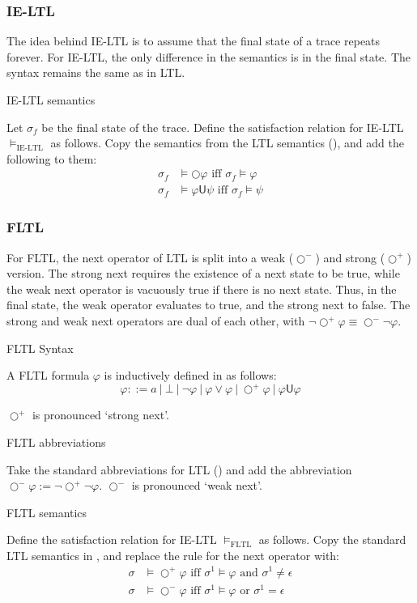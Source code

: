 \documentclass[a4paper]{article}
\newcommand{\U}{\mathsf{U}}
\newcommand{\tand}{\text{ and }}
\newcommand{\tor}{\text{ or }}
\newcommand{\tiff}{\text{ iff }}
\newcommand{\sn}{\bigcirc^+}
\newcommand{\wn}{\bigcirc^-}
\begin{document}
\subsubsection{IE-LTL} The idea behind IE-LTL is to assume that the final state of a trace repeats forever. For IE-LTL, the only difference in the semantics is in the final state. The syntax remains the same as in LTL.
\begin{defn}{IE-LTL semantics}

  Let $\sigma_f$ be the final state of the trace. Define the satisfaction relation for IE-LTL $\vDash_{\text{IE-LTL}}$ as follows. Copy the semantics from the LTL semantics (), and add the following to them:
  \begin{align*}
    \sigma_f &\vDash \bigcirc \varphi \tiff \sigma_f \vDash \varphi\\
    \sigma_f &\vDash \varphi \U \psi \tiff \sigma_f \vDash \psi
  \end{align*}
\end{defn}


\subsubsection{FLTL} For FLTL, the next operator of LTL is split into a weak ($\wn$) and strong ($\sn$) version.
The strong next requires the existence of a next state to be true, while the weak next operator is vacuously true if there is no next state.
Thus, in the final state, the weak operator evaluates to true, and the strong next to false. The strong and weak next operators are dual of each other, with  $\neg\sn\varphi \equiv \wn\neg\varphi$.

\begin{defn}{FLTL Syntax}

  A FLTL formula $\varphi$ is inductively defined in as follows:
  \[\varphi ::= a ~|~ \bot ~|~ \neg \varphi ~|~\varphi \lor \varphi ~|~ \sn \varphi ~|~ \varphi \U\varphi\]

  $\sn$ is pronounced `strong next'.
\end{defn}

\begin{notn}{FLTL abbreviations}\label{fltlabbrev}

  Take the standard abbreviations for LTL () and add the abbreviation $\wn \varphi:= \neg \sn \neg \varphi$. $\wn$ is pronounced `weak next'.
\end{notn}

\begin{defn}{FLTL semantics}

  Define the satisfaction relation for IE-LTL $\vDash_{\text{FLTL}}$ as follows.
  Copy the standard LTL semantics in , and replace the rule for the next operator with:
  \begin{align*}
    \sigma&\vDash\sn\varphi \tiff \sigma^1\vDash\varphi \tand \sigma^1 \neq \epsilon\\
    \sigma&\vDash\wn\varphi \tiff \sigma^1\vDash\varphi \tor \sigma^1 = \epsilon
  \end{align*}
\end{defn}
\end{document}
